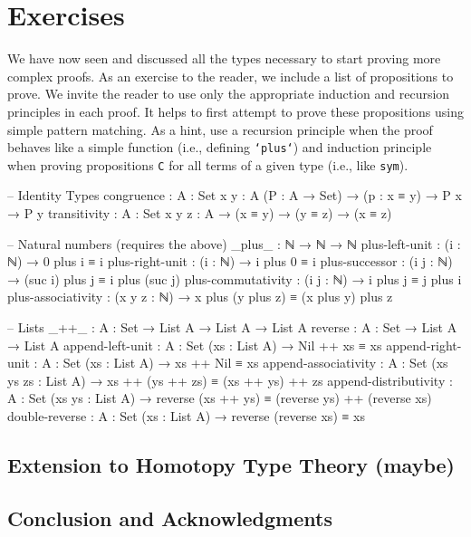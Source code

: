 \documentclass[12pt]{article}
\begin{document}
\section{Exercises}
We have now seen and discussed all the types necessary to start proving more
complex proofs. As an exercise to the reader, we include a list of propositions
to prove. We invite the reader to use only the appropriate induction and
recursion principles in each proof. It helps to first attempt to prove these
propositions using simple pattern matching. As a hint, use a recursion principle
when the proof behaves like a simple function (i.e., defining {\tt `plus`}) and
induction principle when proving propositions {\tt C} for all terms of a given
type (i.e., like {\tt sym}).

\begin{center}
\begin{minipage}{0.9\textwidth}
\begin{code}
-- Identity Types
congruence : {A : Set} {x y : A} (P : A → Set) →
             (p : x ≡ y) → P x → P y
transitivity : {A : Set} {x y z : A} → (x ≡ y) →
               (y ≡ z) → (x ≡ z)

-- Natural numbers (requires the above)
_plus_ : ℕ → ℕ → ℕ
plus-left-unit : (i : ℕ) → 0 plus i ≡ i
plus-right-unit : (i : ℕ) → i plus 0 ≡ i
plus-successor : (i j : ℕ) → (suc i) plus j ≡ i plus (suc j)
plus-commutativity : (i j : ℕ) → i plus j ≡ j plus i
plus-associativity : (x y z : ℕ) →
                     x plus (y plus z) ≡ (x plus y) plus z

-- Lists
_++_ : {A : Set} → List A → List A → List A
reverse : {A : Set} → List A → List A
append-left-unit : {A : Set} (xs : List A) → Nil ++ xs ≡ xs
append-right-unit : {A : Set} (xs : List A) → xs ++ Nil ≡ xs
append-associativity : {A : Set} (xs ys zs : List A) →
                       xs ++ (ys ++ zs) ≡ (xs ++ ys) ++ zs
append-distributivity : {A : Set} (xs ys : List A) →
                        reverse (xs ++ ys) ≡ (reverse ys) ++ (reverse xs) 
double-reverse : {A : Set} (xs : List A) → reverse (reverse xs) ≡ xs

\end{code}
\end{minipage}
\end{center}

\subsection*{Extension to Homotopy Type Theory (maybe)}
\subsection*{Conclusion and Acknowledgments}
\end{document}

